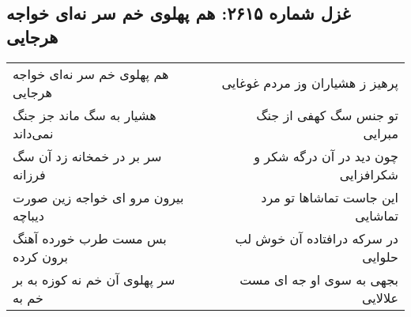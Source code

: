 \begin{center}
\section*{غزل شماره ۲۶۱۵: هم پهلوی خم سر نه‌ای خواجه هرجایی}
\label{sec:2615}
\begin{longtable}{l p{0.5cm} r}
هم پهلوی خم سر نه‌ای خواجه هرجایی
&&
پرهیز ز هشیاران وز مردم غوغایی
\\
هشیار به سگ ماند جز جنگ نمی‌داند
&&
تو جنس سگ کهفی از جنگ مبرایی
\\
سر بر در خمخانه زد آن سگ فرزانه
&&
چون دید در آن درگه شکر و شکرافزایی
\\
بیرون مرو ای خواجه زین صورت دیباچه
&&
این جاست تماشاها تو مرد تماشایی
\\
بس مست طرب خورده آهنگ برون کرده
&&
در سرکه درافتاده آن خوش لب حلوایی
\\
سر پهلوی آن خم نه کوزه به بر خم به
&&
بجهی به سوی او جه ای مست علالایی
\\
\end{longtable}
\end{center}
